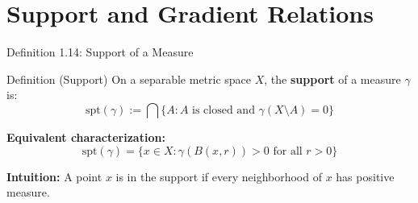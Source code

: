\documentclass[aspectratio=169]{beamer}
\begin{document}
\section{Support and Gradient Relations}

\begin{frame}{Definition 1.14: Support of a Measure}
\begin{block}{Definition (Support)}
On a separable metric space $X$, the \textbf{support} of a measure $\gamma$ is:
\[
\boxed{\text{spt}(\gamma) := \bigcap \{A : A \text{ is closed and } \gamma(X \setminus A) = 0\}}
\]
\end{block}

\vspace{0.4cm}
\textbf{Equivalent characterization:}
\[
\text{spt}(\gamma) = \{x \in X : \gamma(B(x,r)) > 0 \text{ for all } r > 0\}
\]

\vspace{0.3cm}
\textbf{Intuition:} A point $x$ is in the support if every neighborhood of $x$ has positive measure.
\end{frame}
\end{document}
